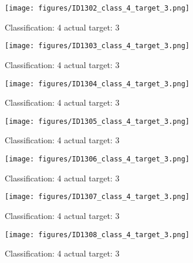 \begin{figure}[h!]
\begin{center}
\texttt{[image: figures/ID1302\_class\_4\_target\_3.png]}
\end{center}
\caption{ Classification: 4 actual target: 3}
\label{fig:ID1302_class_4_target_3}
\end{figure}
\begin{figure}[h!]
\begin{center}
\texttt{[image: figures/ID1303\_class\_4\_target\_3.png]}
\end{center}
\caption{ Classification: 4 actual target: 3}
\label{fig:ID1303_class_4_target_3}
\end{figure}
\begin{figure}[h!]
\begin{center}
\texttt{[image: figures/ID1304\_class\_4\_target\_3.png]}
\end{center}
\caption{ Classification: 4 actual target: 3}
\label{fig:ID1304_class_4_target_3}
\end{figure}
\begin{figure}[h!]
\begin{center}
\texttt{[image: figures/ID1305\_class\_4\_target\_3.png]}
\end{center}
\caption{ Classification: 4 actual target: 3}
\label{fig:ID1305_class_4_target_3}
\end{figure}
\begin{figure}[h!]
\begin{center}
\texttt{[image: figures/ID1306\_class\_4\_target\_3.png]}
\end{center}
\caption{ Classification: 4 actual target: 3}
\label{fig:ID1306_class_4_target_3}
\end{figure}
\begin{figure}[h!]
\begin{center}
\texttt{[image: figures/ID1307\_class\_4\_target\_3.png]}
\end{center}
\caption{ Classification: 4 actual target: 3}
\label{fig:ID1307_class_4_target_3}
\end{figure}
\begin{figure}[h!]
\begin{center}
\texttt{[image: figures/ID1308\_class\_4\_target\_3.png]}
\end{center}
\caption{ Classification: 4 actual target: 3}
\label{fig:ID1308_class_4_target_3}
\end{figure}
